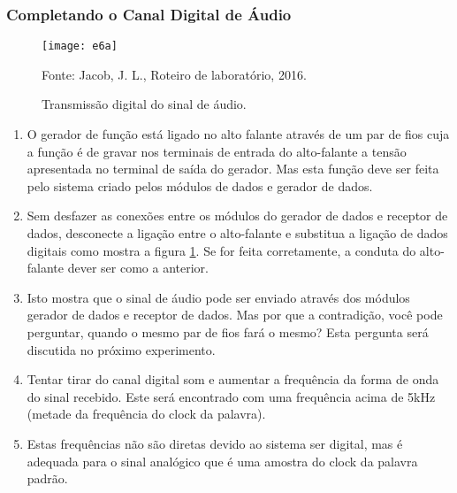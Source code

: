             \subsubsection{Completando o Canal Digital de Áudio}
                \begin{figure}[H]
                    \centering
                    \caption{Transmissão digital do sinal de áudio.}
                    \texttt{[image: e6a]}
                                
                    \small Fonte: Jacob, J. L., Roteiro de laboratório, 2016.
                    \label{fig:e6a}
                \end{figure}
                \begin{enumerate}
                    \item O gerador de função está ligado no alto falante através de um par de fios cuja a função é de gravar nos terminais de entrada do alto-falante a tensão apresentada no terminal de saída do gerador. Mas esta função deve ser feita pelo sistema criado pelos módulos de dados e gerador de dados.
                    
                    \item Sem desfazer as conexões entre os módulos do gerador de dados e receptor de dados, desconecte a ligação entre o alto-falante e substitua a ligação de dados digitais como mostra a figura \ref{fig:e6a}. Se for feita corretamente, a conduta do alto-falante dever ser como a anterior.
                    
                    \item Isto mostra que o sinal de áudio pode ser enviado através dos módulos gerador de dados e receptor de dados. Mas por que a contradição, você pode perguntar, quando o mesmo par de fios fará o mesmo? Esta pergunta será discutida no próximo experimento.
                    
                    \item Tentar tirar do canal digital som e aumentar a frequência da forma de onda do sinal recebido.
                    Este será encontrado com uma frequência acima de 5kHz (metade da frequência do clock da palavra).
                    
                    \item Estas frequências não são diretas devido ao sistema ser digital, mas é adequada para o sinal analógico que é uma amostra do clock da palavra padrão.
                \end{enumerate}
                
